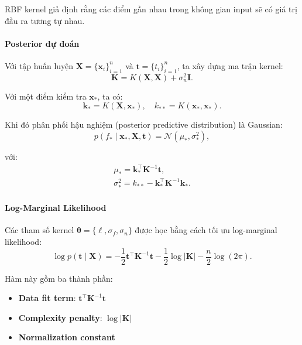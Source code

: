 RBF kernel giả định rằng các điểm gần nhau trong không gian input sẽ có giá trị
đầu ra tương tự nhau.

\paragraph{Posterior dự đoán}

Với tập huấn luyện $\boldsymbol{X} = \{\boldsymbol{x}_i\}_{i=1}^n$ và
$\boldsymbol{t} = \{t_i\}_{i=1}^n$, ta xây dựng ma trận kernel:
\begin{equation}
  \boldsymbol{K} = K(\boldsymbol{X}, \boldsymbol{X}) + \sigma_n^2
  \boldsymbol{I}.
\end{equation}

Với một điểm kiểm tra $\boldsymbol{x}_*$, ta có:
\begin{equation}
  \boldsymbol{k}_* = K(\boldsymbol{X}, \boldsymbol{x}_*), \quad
  k_{**} = K(\boldsymbol{x}_*, \boldsymbol{x}_*).
\end{equation}

Khi đó phân phối hậu nghiệm (posterior predictive distribution) là Gaussian:
\begin{equation}
  p(f_* \mid \boldsymbol{x}_*, \boldsymbol{X}, \boldsymbol{t}) =
  \mathcal{N}(\mu_*, \sigma_*^2),
\end{equation}

với:
\begin{gather}
  \mu_* = \boldsymbol{k}_*^\intercal \boldsymbol{K}^{-1} \boldsymbol{t}, \\
  \sigma_*^2 = k_{**} - \boldsymbol{k}_*^\intercal \boldsymbol{K}^{-1}
  \boldsymbol{k}_*.
\end{gather}

\paragraph{Log-Marginal Likelihood}

Các tham số kernel $\boldsymbol{\theta} = \{\ell, \sigma_f, \sigma_n\}$
được học bằng cách tối ưu log-marginal likelihood:
\begin{equation}
  \log p(\boldsymbol{t} \mid \boldsymbol{X}) =
  -\frac{1}{2} \boldsymbol{t}^\intercal \boldsymbol{K}^{-1} \boldsymbol{t}
  - \frac{1}{2} \log |\boldsymbol{K}|
  - \frac{n}{2} \log(2\pi).
\end{equation}

Hàm này gồm ba thành phần:
\begin{itemize}
    \item \textbf{Data fit term}: $\boldsymbol{t}^\intercal \boldsymbol{K}^{-1}
      \boldsymbol{t}$
    \item \textbf{Complexity penalty}: $\log |\boldsymbol{K}|$
    \item \textbf{Normalization constant}
\end{itemize}

